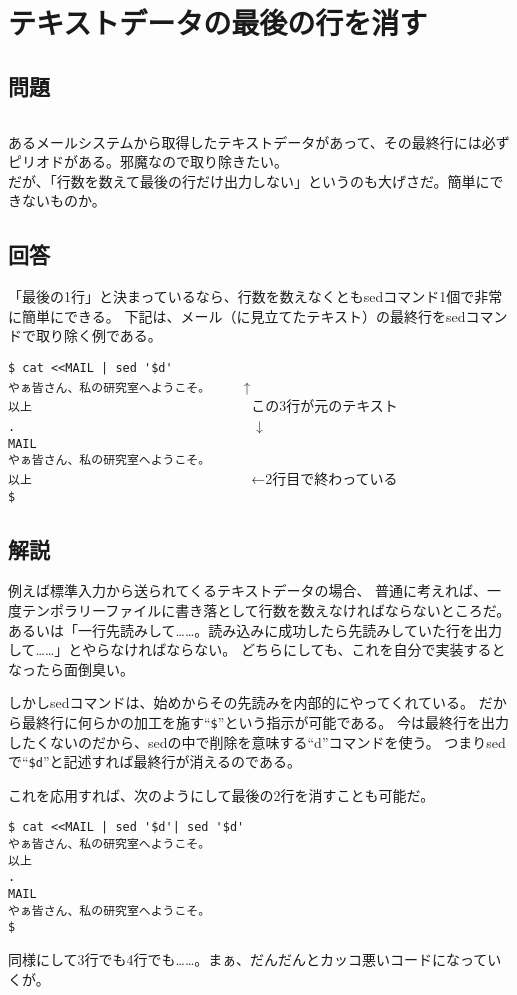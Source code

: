 \section{テキストデータの最後の行を消す}

\subsection*{問題}
\noindent
$\!\!\!\!\!$
\begin{grshfboxit}{160.0mm}
	あるメールシステムから取得したテキストデータがあって、その最終行には必ずピリオドがある。邪魔なので取り除きたい。 \\
	だが、「行数を数えて最後の行だけ出力しない」というのも大げさだ。簡単にできないものか。
\end{grshfboxit}

\subsection*{回答}
「最後の1行」と決まっているなら、行数を数えなくともsedコマンド1個で非常に簡単にできる。
下記は、メール（に見立てたテキスト）の最終行をsedコマンドで取り除く例である。
\begin{screen}
	\verb!$ cat <<MAIL | sed '$d'! \return \\
	\verb|やぁ皆さん、私の研究室へようこそ。    | ↑                    \\
	\verb|以上                              | この3行が元のテキスト \\
	\verb|.                                 | ↓                    \\
	\verb|MAIL| \\
	\verb|やぁ皆さん、私の研究室へようこそ。| \\
	\verb|以上                              | ←2行目で終わっている \\
	\verb|$ |
\end{screen}

\subsection*{解説}

例えば標準入力から送られてくるテキストデータの場合、
普通に考えれば、一度テンポラリーファイルに書き落として行数を数えなければならないところだ。
あるいは「一行先読みして……。読み込みに成功したら先読みしていた行を出力して……」とやらなければならない。
どちらにしても、これを自分で実装するとなったら面倒臭い。

しかしsedコマンドは、始めからその先読みを内部的にやってくれている。
だから最終行に何らかの加工を施す``\verb|$|''という指示が可能である。
今は最終行を出力したくないのだから、sedの中で削除を意味する``d''コマンドを使う。
つまりsedで``\verb|$d|''と記述すれば最終行が消えるのである。

これを応用すれば、次のようにして最後の2行を消すことも可能だ。

\begin{screen}
	\verb!$ cat <<MAIL | sed '$d'| sed '$d'! \return \\
	\verb|やぁ皆さん、私の研究室へようこそ。| \\
	\verb|以上| \\
	\verb|.| \\
	\verb|MAIL| \\
	\verb|やぁ皆さん、私の研究室へようこそ。| \\
	\verb|$ |
\end{screen}

同様にして3行でも4行でも……。まぁ、だんだんとカッコ悪いコードになっていくが。